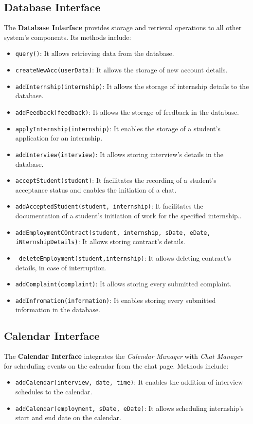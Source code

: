 \subsection{Database Interface}
The \textbf{Database Interface} provides storage and retrieval operations to all other system's components. Its methods include:
\begin{itemize}
    \item \texttt{query()}: It allows retrieving data from the database.
    \item \texttt{createNewAcc(userData)}: It allows the storage of new account details.
    \item \texttt{addInternship(internship)}: It allows the storage of internship details to the database.
    \item \texttt{addFeedback(feedback)}: It allows the storage of feedback in the database.
    \item \texttt{applyInternship(internship)}: It enables the storage of a student's application for an internship.
    \item \texttt{addInterview(interview)}: It allows storing interview's details in the database.
    \item \texttt{acceptStudent(student)}: It facilitates the recording of a student's acceptance status and enables the initiation of a chat.
    \item \texttt{addAcceptedStudent(student, internship)}: It facilitates the documentation of a student's initiation of work for the specified internship..
    \item \texttt{addEmploymentCOntract(student, internship, sDate, eDate, iNternshipDetails)}: It allows storing contract's details.
    \item \texttt{ deleteEmployment(student,internship)}: It allows deleting contract's details, in case of interruption.
    \item \texttt{addComplaint(complaint)}: It allows storing every submitted complaint.
    \item \texttt{addInfromation(information)}: It enables storing every submitted information in the database.
\end{itemize}

\subsection{Calendar Interface}
The \textbf{Calendar Interface} integrates the \textit{Calendar Manager} with \textit{Chat Manager} for scheduling events on the calendar from the chat page. Methods include:
\begin{itemize}
    \item \texttt{addCalendar(interview, date, time)}: It enables the addition of interview schedules to the calendar.
    \item \texttt{addCalendar(employment, sDate, eDate)}: It allows scheduling internship's start and end date on the calendar.
\end{itemize}

